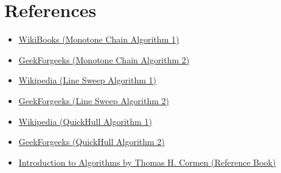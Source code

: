 \documentclass[a4paper, 10pt, twocolumn]{article}
\begin{document}
\section{References}
\begin{itemize}
    \item \href{https://en.wikibooks.org/wiki/Algorithm_Implementation/Geometry/Convex_hull/Monotone_chain}{WikiBooks (Monotone Chain Algorithm 1)}
    \item \href{https://www.geeksforgeeks.org/convex-hull-monotone-chain-algorithm/}{GeekForgeeks (Monotone Chain Algorithm 2)}
    \item \href{https://en.wikipedia.org/wiki/Sweep_line_algorithm}{Wikipedia (Line Sweep Algorithm 1)}
    \item \href{https://www.geeksforgeeks.org/closest-pair-of-points-using-sweep-line-algorithm/}{GeekForgeeks (Line Sweep Algorithm 2)}
    \item \href{https://en.wikipedia.org/wiki/Quickhull}{Wikipedia (QuickHull Algorithm 1)}
    \item \href{https://www.geeksforgeeks.org/quickhull-algorithm-convex-hull/}{GeekForgeeks (QuickHull Algorithm 2)}
    \item \href{Introduction to Algorithms by Thomas H. Cormen}{Introduction to Algorithms by Thomas H. Cormen (Reference Book)}
\end{itemize}
\end{document}
